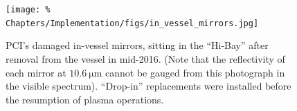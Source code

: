 \begin{figure}
  \centering
  \texttt{[image: \%
    Chapters/Implementation/figs/in\_vessel\_mirrors.jpg]}
  \caption[PCI's damaged in-vessel mirrors]{%
    PCI's damaged in-vessel mirrors, sitting
    in the \diiid \space ``Hi-Bay''
    after removal from the vessel in mid-2016.
    (Note that the reflectivity of each mirror at $\SI{10.6}{\micro\meter}$
    cannot be gauged from this photograph in the visible spectrum).
    ``Drop-in'' replacements were installed
    before the resumption of plasma operations.}
\label{fig:Implementation:in_vessel_mirrors}
\end{figure}




